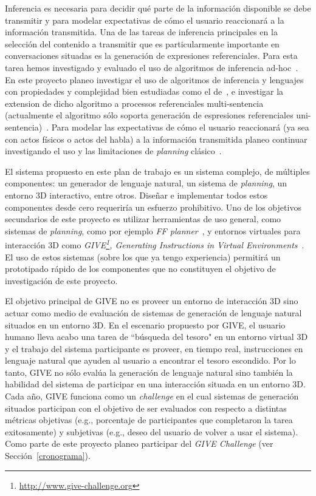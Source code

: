 \documentclass[11pt]{article}
\begin{document}
Inferencia es necesaria para decidir qu\'e parte de la
informaci\'on
disponible se debe transmitir y para modelar expectativas de c\'omo el usuario
reaccionar\'a a la informaci\'on transmitida. Una de las tareas de inferencia
principales en la selecci\'on del contenido a transmitir que es particularmente
importante en conversaciones situadas es la generaci\'on de expresiones
referenciales. Para esta tarea hemos investigado y evaluado el uso de algoritmos
de inferencia ad-hoc~\citep{amoia10}. En este proyecto planeo investigar el uso
de algoritmos de inferencia y lenguajes con propiedades y complejidad bien
estudiadas como el de~\cite{AKS08}, e investigar la extension de dicho
algoritmo a processos referenciales multi-sentencia (actualmente el algoritmo
s\'olo soporta generaci\'on de espresiones referenciales
uni-sentencia)~\citep{areces10,benotti10b}. Para modelar las expectativas de
c\'omo el usuario reaccionar\'a (ya sea con actos f\'isicos o actos del habla) a
la informaci\'on transmitida planeo continuar investigando el uso y las
limitaciones de \emph{planning} cl\'asico~\citep{benotti09c}. 

El sistema propuesto en este plan de trabajo es un sistema complejo, de
m\'ultiples componentes: un generador de lenguaje natural, un sistema de
\emph{planning}, un entorno 3D interactivo, entre otros. Dise\~nar e implementar
todos estos componentes desde cero requerir\'ia un esfuerzo prohibitivo. Uno de
los objetivos secundarios de este proyecto es utilizar herramientas de uso
general, como sistemas de \emph{planning}, como por ejemplo \emph{FF
planner}~\citep{hoffmann01}, y entornos virtuales para interacci\'on 3D como
\emph{GIVE\footnote{\url{http://www.give-challenge.org}}, Generating
Instructions in Virtual Environments}~\citep{byron09}. El uso de estos sistemas
(sobre los que ya tengo experiencia) permitir\'a un prototipado r\'apido de los
componentes que no constituyen el objetivo de investigaci\'on de este proyecto. 


El objetivo principal de GIVE no es proveer un entorno de interacci\'on 3D
sino actuar como medio de evaluaci\'on de sistemas de generaci\'on de lenguaje
natural situados en un entorno 3D. En el escenario propuesto por GIVE, el
usuario
humano lleva acabo una tarea de ``b\'usqueda del tesoro" en un entorno
virtual 3D y el trabajo del sistema participante es proveer, en tiempo
real, instrucciones en lenguaje natural que ayuden al usuario
a encontrar el tesoro escondido.  Por lo tanto, GIVE no s\'olo eval\'ua
la generaci\'on de lenguaje natural sino tambi\'en la habilidad del
sistema de participar en una interacci\'on situada en un entorno 3D.
Cada a\~no, GIVE funciona como un
\emph{challenge} en el cual sistemas de generaci\'on situados participan con el
objetivo de ser evaluados con respecto a distintas m\'etricas objetivas
(e.g., porcentaje de participantes que completaron la tarea exitosamente) y
subjetivas (e.g., deseo del usuario de volver a usar el sistema). Como parte de
este proyecto planeo participar del \emph{GIVE Challenge} (ver
Secci\'on~\ref{cronograma}). 
\end{document}
